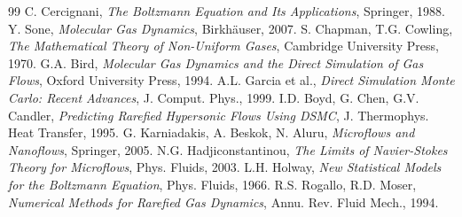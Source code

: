 \documentclass[12pt,a4paper]{report}
\begin{document}
	\begin{thebibliography}{99}
		 C. Cercignani, \textit{The Boltzmann Equation and Its Applications}, Springer, 1988.
		 Y. Sone, \textit{Molecular Gas Dynamics}, Birkhäuser, 2007.
		 S. Chapman, T.G. Cowling, \textit{The Mathematical Theory of Non-Uniform Gases}, Cambridge University Press, 1970.
		 G.A. Bird, \textit{Molecular Gas Dynamics and the Direct Simulation of Gas Flows}, Oxford University Press, 1994.
		 A.L. Garcia et al., \textit{Direct Simulation Monte Carlo: Recent Advances}, J. Comput. Phys., 1999.
		 I.D. Boyd, G. Chen, G.V. Candler, \textit{Predicting Rarefied Hypersonic Flows Using DSMC}, J. Thermophys. Heat Transfer, 1995.
		 G. Karniadakis, A. Beskok, N. Aluru, \textit{Microflows and Nanoflows}, Springer, 2005.
		 N.G. Hadjiconstantinou, \textit{The Limits of Navier-Stokes Theory for Microflows}, Phys. Fluids, 2003.
		 L.H. Holway, \textit{New Statistical Models for the Boltzmann Equation}, Phys. Fluids, 1966.
		 R.S. Rogallo, R.D. Moser, \textit{Numerical Methods for Rarefied Gas Dynamics}, Annu. Rev. Fluid Mech., 1994.
	\end{thebibliography}
	
\end{document}
